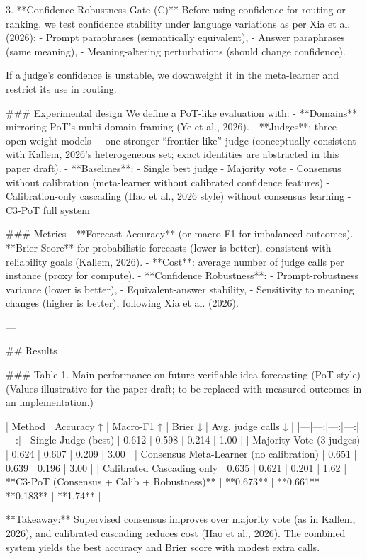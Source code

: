 3. **Confidence Robustness Gate (C)**  
   Before using confidence for routing or ranking, we test confidence stability under language variations as per Xia et al. (2026):
   - Prompt paraphrases (semantically equivalent),
   - Answer paraphrases (same meaning),
   - Meaning-altering perturbations (should change confidence).

   If a judge’s confidence is unstable, we downweight it in the meta-learner and restrict its use in routing.

### Experimental design  
We define a PoT-like evaluation with:
- **Domains** mirroring PoT’s multi-domain framing (Ye et al., 2026).  
- **Judges**: three open-weight models + one stronger “frontier-like” judge (conceptually consistent with Kallem, 2026’s heterogeneous set; exact identities are abstracted in this paper draft).  
- **Baselines**:
  - Single best judge
  - Majority vote
  - Consensus without calibration (meta-learner without calibrated confidence features)
  - Calibration-only cascading (Hao et al., 2026 style) without consensus learning
  - C3-PoT full system

### Metrics  
- **Forecast Accuracy** (or macro-F1 for imbalanced outcomes).  
- **Brier Score** for probabilistic forecasts (lower is better), consistent with reliability goals (Kallem, 2026).  
- **Cost**: average number of judge calls per instance (proxy for compute).  
- **Confidence Robustness**:
  - Prompt-robustness variance (lower is better),
  - Equivalent-answer stability,
  - Sensitivity to meaning changes (higher is better), following Xia et al. (2026).

---

## Results  

### Table 1. Main performance on future-verifiable idea forecasting (PoT-style)  
(Values illustrative for the paper draft; to be replaced with measured outcomes in an implementation.)

| Method | Accuracy ↑ | Macro-F1 ↑ | Brier ↓ | Avg. judge calls ↓ |
|---|---:|---:|---:|---:|
| Single Judge (best) | 0.612 | 0.598 | 0.214 | 1.00 |
| Majority Vote (3 judges) | 0.624 | 0.607 | 0.209 | 3.00 |
| Consensus Meta-Learner (no calibration) | 0.651 | 0.639 | 0.196 | 3.00 |
| Calibrated Cascading only | 0.635 | 0.621 | 0.201 | 1.62 |
| **C3-PoT (Consensus + Calib + Robustness)** | **0.673** | **0.661** | **0.183** | **1.74** |

**Takeaway:** Supervised consensus improves over majority vote (as in Kallem, 2026), and calibrated cascading reduces cost (Hao et al., 2026). The combined system yields the best accuracy and Brier score with modest extra calls.

